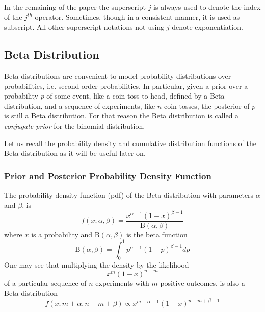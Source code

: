\documentclass[runningheads]{llncs}
\begin{document}
\begin{remark}
In the remaining of the paper the superscript $j$ is always used to
denote the index of the $j^{th}$ operator. Sometimes, though in a
consistent manner, it is used as subscript. All other superscript
notations not using $j$ denote exponentiation.
\end{remark}

\subsection{Beta Distribution}

Beta distributions \cite{Abourizk94Fitting} are convenient to model
probability distributions over probabilities, i.e. second order
probabilities. In particular, given a prior over a probability $p$ of
some event, like a coin toss to head, defined by a Beta distribution,
and a sequence of experiments, like $n$ coin tosses, the posterior of
$p$ is still a Beta distribution. For that reason the Beta
distribution is called a \emph{conjugate prior} for the binomial
distribution.

Let us recall the probability density and cumulative distribution
functions of the Beta distribution as it will be useful later on.
\subsubsection{Prior and Posterior Probability Density Function}
The probability density function (pdf) of the Beta distribution with
parameters $\alpha$ and $\beta$, is
\begin{equation}
  \label{beta-pdf}
f(x; \alpha, \beta) = \frac{x^{\alpha - 1} (1-x)^{\beta - 1}}
                           {\mathrm{B}(\alpha, \beta)}
\end{equation}
where $x$ is a probability and $\mathrm{B}(\alpha, \beta)$ is the beta
function
\begin{equation}
\mathrm{B}(\alpha, \beta) = \int_0^1 p^{\alpha - 1}(1-p)^{\beta - 1}
dp
\end{equation}
One may see that multiplying the density by the likelihood
\begin{equation}
x^m (1-x)^{n-m}
\end{equation}
of a particular sequence of $n$ experiments with $m$ positive
outcomes, is also a Beta distribution
\begin{equation}
f(x; m+\alpha, n-m+\beta) \propto x^{m+\alpha - 1} (1-x)^{n-m+\beta - 1}
\end{equation}
\end{document}
